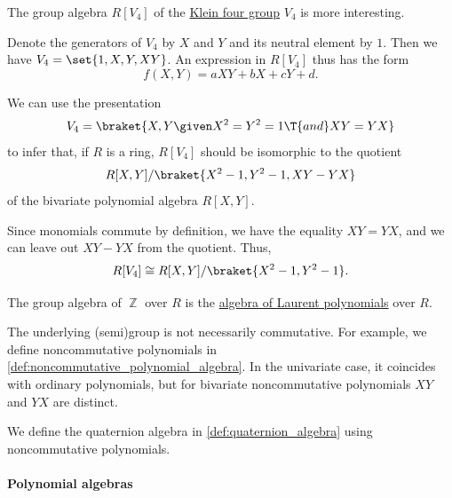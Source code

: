 \begin{example}
\begin{thmenum}
     The group algebra \( R[V_4] \) of the \hyperref[def:klein_four_group]{Klein four group} \( V_4 \) is more interesting.

    Denote the generators of \( V_4 \) by \( X \) and \( Y \) and its neutral element by \( 1 \). Then we have \( V_4 = \set{ 1, X, Y, XY } \). An expression in \( R[V_4] \) thus has the form
    \begin{equation*}
      f(X, Y) = aXY + bX + cY + d.
    \end{equation*}

    We can use the presentation
    \begin{equation*}
      V_4 = \braket{ X, Y \given X^2 = Y^2 = 1 \T{and} XY = YX }
    \end{equation*}
    to infer that, if \( R \) is a ring, \( R[V_4] \) should be isomorphic to the quotient
    \begin{equation*}
      R[X, Y] / \braket{ X^2 - 1, Y^2 - 1, XY - YX }
    \end{equation*}
    of the bivariate polynomial algebra \( R[X, Y] \).

    Since monomials commute by definition, we have the equality \( XY = YX \), and we can leave out \( XY - YX \) from the quotient. Thus,
    \begin{equation*}
      R[V_4] \cong R[X, Y] / \braket{ X^2 - 1, Y^2 - 1 }.
    \end{equation*}

     The group algebra of \( \BbbZ \) over \( R \) is the \hyperref[def:laurent_polynomial_algebra]{algebra of Laurent polynomials} over \( R \).

     The underlying (semi)group is not necessarily commutative. For example, we define noncommutative polynomials in \cref{def:noncommutative_polynomial_algebra}. In the univariate case, it coincides with ordinary polynomials, but for bivariate noncommutative polynomials \( XY \) and \( YX \) are distinct.

    We define the quaternion algebra in \cref{def:quaternion_algebra} using noncommutative polynomials.
  \end{thmenum}
\end{example}

\paragraph{Polynomial algebras}

